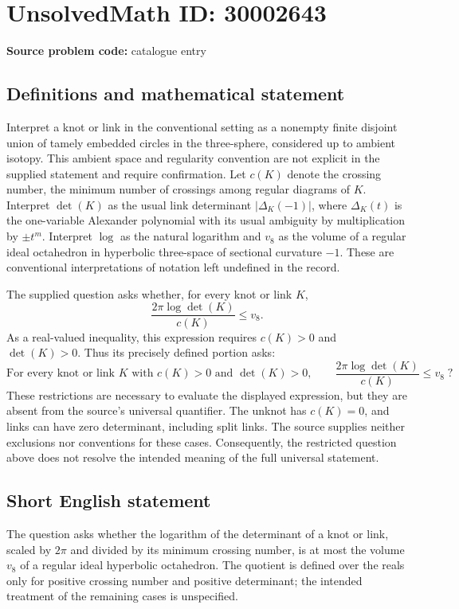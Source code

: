 \documentclass[11pt]{article}
\begin{document}
\section*{UnsolvedMath ID: 30002643}
\textbf{Source problem code:} catalogue entry
\subsection{Definitions and mathematical statement}
Interpret a knot or link in the conventional setting as a nonempty finite disjoint union of tamely embedded circles in the three-sphere, considered up to ambient isotopy. This ambient space and regularity convention are not explicit in the supplied statement and require confirmation. Let \(c(K)\) denote the crossing number, the minimum number of crossings among regular diagrams of \(K\). Interpret \(\det(K)\) as the usual link determinant \(\lvert\Delta_K(-1)\rvert\), where \(\Delta_K(t)\) is the one-variable Alexander polynomial with its usual ambiguity by multiplication by \(\pm t^m\). Interpret \(\log\) as the natural logarithm and \(v_8\) as the volume of a regular ideal octahedron in hyperbolic three-space of sectional curvature \(-1\). These are conventional interpretations of notation left undefined in the record.

The supplied question asks whether, for every knot or link \(K\),
\[
\frac{2\pi\log\det(K)}{c(K)}\leq v_8.
\]
As a real-valued inequality, this expression requires \(c(K)>0\) and \(\det(K)>0\). Thus its precisely defined portion asks:
\[
\text{For every knot or link }K\text{ with }c(K)>0\text{ and }\det(K)>0,
\qquad
\frac{2\pi\log\det(K)}{c(K)}\leq v_8\;?
\]
These restrictions are necessary to evaluate the displayed expression, but they are absent from the source's universal quantifier. The unknot has \(c(K)=0\), and links can have zero determinant, including split links. The source supplies neither exclusions nor conventions for these cases. Consequently, the restricted question above does not resolve the intended meaning of the full universal statement.
\subsection{Short English statement}
The question asks whether the logarithm of the determinant of a knot or link, scaled by \(2\pi\) and divided by its minimum crossing number, is at most the volume \(v_8\) of a regular ideal hyperbolic octahedron. The quotient is defined over the reals only for positive crossing number and positive determinant; the intended treatment of the remaining cases is unspecified.
\end{document}
